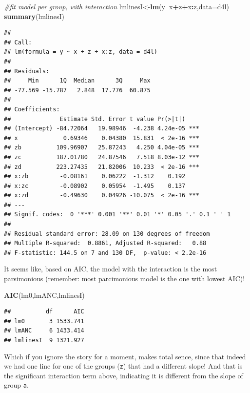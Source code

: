 \documentclass[
]{book}
\newenvironment{Shaded}{\begin{snugshade}}{\end{snugshade}}
\newcommand{\CommentTok}[1]{\textcolor[rgb]{0.56,0.35,0.01}{\textit{#1}}}
\newcommand{\DataTypeTok}[1]{\textcolor[rgb]{0.13,0.29,0.53}{#1}}
\newcommand{\KeywordTok}[1]{\textcolor[rgb]{0.13,0.29,0.53}{\textbf{#1}}}
\newcommand{\NormalTok}[1]{#1}
\newcommand{\OperatorTok}[1]{\textcolor[rgb]{0.81,0.36,0.00}{\textbf{#1}}}
\begin{document}
\begin{Shaded}
\begin{Highlighting}[]
\CommentTok{#fit model per group, with interaction}
\NormalTok{lmlinesI<-}\KeywordTok{lm}\NormalTok{(y}\OperatorTok{~}\NormalTok{x}\OperatorTok{+}\NormalTok{z}\OperatorTok{+}\NormalTok{x}\OperatorTok{:}\NormalTok{z,}\DataTypeTok{data=}\NormalTok{d4l)}
\KeywordTok{summary}\NormalTok{(lmlinesI)}
\end{Highlighting}
\end{Shaded}

\begin{verbatim}
## 
## Call:
## lm(formula = y ~ x + z + x:z, data = d4l)
## 
## Residuals:
##     Min      1Q  Median      3Q     Max 
## -77.569 -15.787   2.848  17.776  60.875 
## 
## Coefficients:
##              Estimate Std. Error t value Pr(>|t|)    
## (Intercept) -84.72064   19.98946  -4.238 4.24e-05 ***
## x             0.69346    0.04380  15.831  < 2e-16 ***
## zb          109.96907   25.87243   4.250 4.04e-05 ***
## zc          187.01780   24.87546   7.518 8.03e-12 ***
## zd          223.27435   21.82006  10.233  < 2e-16 ***
## x:zb         -0.08161    0.06222  -1.312    0.192    
## x:zc         -0.08902    0.05954  -1.495    0.137    
## x:zd         -0.49630    0.04926 -10.075  < 2e-16 ***
## ---
## Signif. codes:  0 '***' 0.001 '**' 0.01 '*' 0.05 '.' 0.1 ' ' 1
## 
## Residual standard error: 28.09 on 130 degrees of freedom
## Multiple R-squared:  0.8861,	Adjusted R-squared:   0.88 
## F-statistic: 144.5 on 7 and 130 DF,  p-value: < 2.2e-16
\end{verbatim}

It seems like, based on AIC, the model with the interaction is the most parsimonious (remember: most parcimonious model is the one with lowest AIC)!

\begin{Shaded}
\begin{Highlighting}[]
\KeywordTok{AIC}\NormalTok{(lm0,lmANC,lmlinesI)}
\end{Highlighting}
\end{Shaded}

\begin{verbatim}
##          df      AIC
## lm0       3 1533.741
## lmANC     6 1433.414
## lmlinesI  9 1321.927
\end{verbatim}

Which if you ignore the story for a moment, makes total sence, since that indeed we had one line for one of the groups (\texttt{z}) that had a different slope! And that is the significant interaction term above, indicating it is different from the slope of group \texttt{a}.
\end{document}
